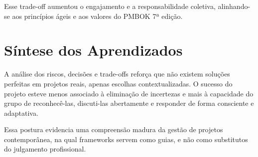 Esse trade-off aumentou o engajamento e a responsabilidade coletiva, alinhando-se aos princípios ágeis e aos valores do PMBOK 7ª edição.

\section{Síntese dos Aprendizados}

A análise dos riscos, decisões e trade-offs reforça que não existem soluções perfeitas em projetos reais, apenas escolhas contextualizadas. O sucesso do projeto esteve menos associado à eliminação de incertezas e mais à capacidade do grupo de reconhecê-las, discuti-las abertamente e responder de forma consciente e adaptativa.

Essa postura evidencia uma compreensão madura da gestão de projetos contemporânea, na qual frameworks servem como guias, e não como substitutos do julgamento profissional.
